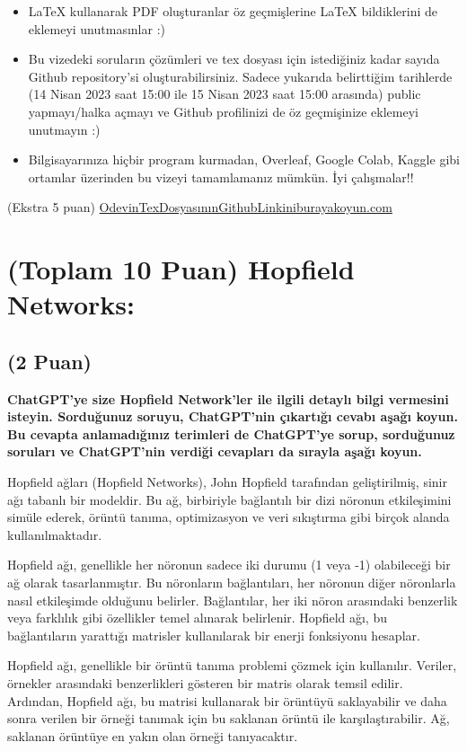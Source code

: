 \documentclass[11pt]{article}
\begin{document}
\begin{itemize}
    \item LaTeX kullanarak PDF oluşturanlar öz geçmişlerine LaTeX bildiklerini de eklemeyi unutmasınlar :)
    \item Bu vizedeki soruların çözümleri ve tex dosyası için istediğiniz kadar sayıda Github repository'si oluşturabilirsiniz. Sadece yukarıda belirttiğim tarihlerde (14 Nisan 2023 saat 15:00 ile 15 Nisan 2023 saat 15:00 arasında) public yapmayı/halka açmayı ve Github profilinizi de öz geçmişinize eklemeyi unutmayın :)
    \item Bilgisayarınıza hiçbir program kurmadan, Overleaf, Google Colab, Kaggle gibi ortamlar üzerinden bu vizeyi tamamlamanız mümkün. İyi çalışmalar!!
\end{itemize}

(Ekstra 5 puan) \url{OdevinTexDosyasınınGithubLinkiniburayakoyun.com}

\newpage
\section{(Toplam 10 Puan) Hopfield Networks:}

\subsection{(2 Puan)} \textbf{ChatGPT’ye size  Hopfield  Network’ler  ile  ilgili  detaylı  bilgi  vermesini isteyin. Sorduğunuz soruyu, ChatGPT'nin çıkartığı cevabı aşağı koyun. Bu cevapta anlamadığınız terimleri de ChatGPT’ye sorup, sorduğunuz soruları ve ChatGPT’nin verdiği cevapları da sırayla aşağı koyun.}

Hopfield ağları (Hopfield Networks), John Hopfield tarafından geliştirilmiş, sinir ağı tabanlı bir modeldir. Bu ağ, birbiriyle bağlantılı bir dizi nöronun etkileşimini simüle ederek, örüntü tanıma, optimizasyon ve veri sıkıştırma gibi birçok alanda kullanılmaktadır.

Hopfield ağı, genellikle her nöronun sadece iki durumu (1 veya -1) olabileceği bir ağ olarak tasarlanmıştır. Bu nöronların bağlantıları, her nöronun diğer nöronlarla nasıl etkileşimde olduğunu belirler. Bağlantılar, her iki nöron arasındaki benzerlik veya farklılık gibi özellikler temel alınarak belirlenir. Hopfield ağı, bu bağlantıların yarattığı matrisler kullanılarak bir enerji fonksiyonu hesaplar.

Hopfield ağı, genellikle bir örüntü tanıma problemi çözmek için kullanılır. Veriler, örnekler arasındaki benzerlikleri gösteren bir matris olarak temsil edilir. Ardından, Hopfield ağı, bu matrisi kullanarak bir örüntüyü saklayabilir ve daha sonra verilen bir örneği tanımak için bu saklanan örüntü ile karşılaştırabilir. Ağ, saklanan örüntüye en yakın olan örneği tanıyacaktır.
\end{document}
